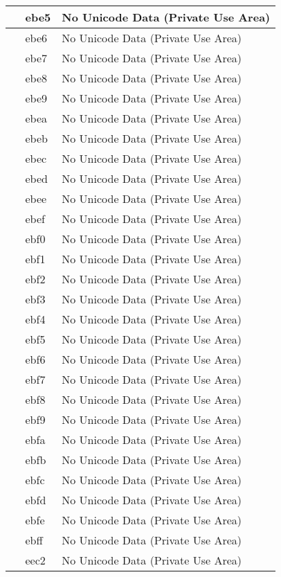 \documentclass[12pt,letterpaper,openany]{book}
\begin{document}
\begin{center}
\begin{supertabular}{|m{0.25in}|m{0.5in}|m{4in}|}
 & ebe5 & No Unicode Data (Private Use Area)\\\hline
 & ebe6 & No Unicode Data (Private Use Area)\\\hline
 & ebe7 & No Unicode Data (Private Use Area)\\\hline
 & ebe8 & No Unicode Data (Private Use Area)\\\hline
 & ebe9 & No Unicode Data (Private Use Area)\\\hline
 & ebea & No Unicode Data (Private Use Area)\\\hline
 & ebeb & No Unicode Data (Private Use Area)\\\hline
 & ebec & No Unicode Data (Private Use Area)\\\hline
 & ebed & No Unicode Data (Private Use Area)\\\hline
 & ebee & No Unicode Data (Private Use Area)\\\hline
 & ebef & No Unicode Data (Private Use Area)\\\hline
 & ebf0 & No Unicode Data (Private Use Area)\\\hline
 & ebf1 & No Unicode Data (Private Use Area)\\\hline
 & ebf2 & No Unicode Data (Private Use Area)\\\hline
 & ebf3 & No Unicode Data (Private Use Area)\\\hline
 & ebf4 & No Unicode Data (Private Use Area)\\\hline
 & ebf5 & No Unicode Data (Private Use Area)\\\hline
 & ebf6 & No Unicode Data (Private Use Area)\\\hline
 & ebf7 & No Unicode Data (Private Use Area)\\\hline
 & ebf8 & No Unicode Data (Private Use Area)\\\hline
 & ebf9 & No Unicode Data (Private Use Area)\\\hline
 & ebfa & No Unicode Data (Private Use Area)\\\hline
 & ebfb & No Unicode Data (Private Use Area)\\\hline
 & ebfc & No Unicode Data (Private Use Area)\\\hline
 & ebfd & No Unicode Data (Private Use Area)\\\hline
 & ebfe & No Unicode Data (Private Use Area)\\\hline
 & ebff & No Unicode Data (Private Use Area)\\\hline
 & eec2 & No Unicode Data (Private Use Area)\\\hline

\end{supertabular}
\end{center}
\end{document}
